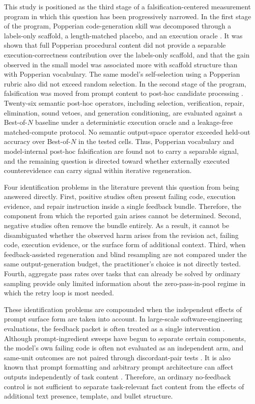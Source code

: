 \documentclass{article}
\numberwithin{equation}{section}  %
\theoremstyle{definition}
\begin{document}
This study is positioned as the third stage of a falsification-centered measurement program in which
this question has been progressively narrowed. In the first stage of the program, Popperian
code-generation skill was decomposed through a labels-only scaffold, a length-matched placebo, and an
execution oracle \citep{iscan2026scaffold}. It was shown that full Popperian procedural content did
not provide a separable execution-correctness contribution over the labels-only scaffold, and that the
gain observed in the small model was associated more with scaffold structure than with Popperian
vocabulary. The same model's self-selection using a Popperian rubric also did not exceed random
selection. In the second stage of the program, falsification was moved from prompt content to post-hoc
candidate processing \citep{iscan2026selection}. Twenty-six semantic post-hoc operators, including
selection, verification, repair, elimination, sound vetoes, and generation conditioning, are evaluated
against a Best-of-$N$ baseline under a deterministic execution oracle and a leakage-free matched-compute
protocol. No semantic output-space operator exceeded held-out accuracy over Best-of-$N$ in the tested
cells. Thus, Popperian vocabulary and model-internal post-hoc falsification are found not to carry a
separable signal, and the remaining question is directed toward whether externally executed
counterevidence can carry signal within iterative regeneration.

Four identification problems in the literature prevent this question from being answered directly.
First, positive studies often present failing code, execution evidence, and repair instruction inside
a single feedback bundle. Therefore, the component from which the reported gain arises cannot be
determined. Second, negative studies often remove the bundle entirely. As a result, it cannot be
disambiguated whether the observed harm arises from the revision act, failing code, execution evidence,
or the surface form of additional context. Third, when feedback-assisted regeneration and blind
resampling are not compared under the same output-generation budget, the practitioner's choice is not
directly tested. Fourth, aggregate pass rates over tasks that can already be solved by ordinary sampling
provide only limited information about the zero-pass-in-pool regime in which the retry loop is most
needed.

These identification problems are compounded when the independent effects of prompt surface
form are taken into account. In large-scale software-engineering evaluations, the feedback packet is
often treated as a single intervention \citep{zheng2025understanding}. Although prompt-ingredient
sweeps have begun to separate certain components, the model's own failing code is often not evaluated
as an independent arm, and same-unit outcomes are not paired through discordant-pair tests
\citep{khojah2025promptprogramming}. It is also known that prompt formatting and arbitrary prompt
architecture can affect outputs independently of task content
\citep{sclar2024formatting,brucks2025prompt}. Therefore, an ordinary no-feedback control is not
sufficient to separate task-relevant fact content from the effects of additional text presence,
template, and bullet structure.
\end{document}
